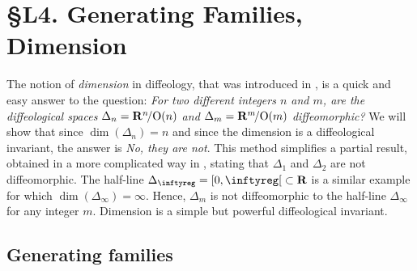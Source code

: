 
\chapter*{\S L4. Generating Families, Dimension}
\setcounter{footnote}{0}

\begin{abstract}
  In this lecture we introduce first the notion of \emph{generating family},
  and we'll see an application in the definition of \emph{dimension in diffeology}.
  Applied to the quotients $\Delta_m = \RR^m\!/\O(\RR^m)$,
  we prove that $\Delta_m$ and $\Delta_n$ are not diffeomorphic if $n \neq m$,
  and not diffeomorphic to the half-line $\Delta_\infty = \LeftClosedInterval{0,\infty} \subset \RR$.
\end{abstract}


The notion of \emph{dimension} in diffeology,
that was introduced in \cite{PIZ07},
is a quick and easy answer to the question:
\emph{For two different integers $n$ and $m$,
are the diffeological spaces $\Delta_n = \mathbf{R}^n\!/\mathrm{O}(n)$ and $\Delta_m = \mathbf{R}^m\!/\mathrm{O}(m)$ diffeomorphic?}
We will show that since $\dim(\Delta_n) = n$ and since the
dimension is a diffeological invariant,
the answer is \emph{No, they are not}.
This method simplifies a partial result,
obtained in a more complicated way in \cite{Igl85},
stating that $\Delta_1$ and $\Delta_2$ are not diffeomorphic.
The half-line $\Delta_\infty = \LeftClosedInterval{0, \infty} \subset \RR$ is a similar example for which $\dim(\Delta_\infty) = \infty$.
Hence,
$\Delta_m$ is not diffeomorphic to the half-line $\Delta_\infty$ for any integer $m$.
Dimension is a simple but powerful diffeological invariant.

\section{Generating families}

